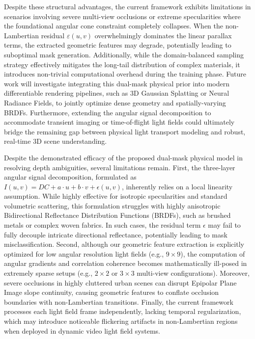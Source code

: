 Despite these structural advantages, the current framework exhibits limitations in scenarios involving severe multi-view occlusions or extreme specularities where the foundational angular cone constraint completely collapses. When the non-Lambertian residual $\varepsilon(u,v)$ overwhelmingly dominates the linear parallax terms, the extracted geometric features may degrade, potentially leading to suboptimal mask generation. Additionally, while the domain-balanced sampling strategy effectively mitigates the long-tail distribution of complex materials, it introduces non-trivial computational overhead during the training phase. Future work will investigate integrating this dual-mask physical prior into modern differentiable rendering pipelines, such as 3D Gaussian Splatting or Neural Radiance Fields, to jointly optimize dense geometry and spatially-varying BRDFs. Furthermore, extending the angular signal decomposition to accommodate transient imaging or time-of-flight light fields could ultimately bridge the remaining gap between physical light transport modeling and robust, real-time 3D scene understanding.

Despite the demonstrated efficacy of the proposed dual-mask physical model in resolving depth ambiguities, several limitations remain. First, the three-layer angular signal decomposition, formulated as $I(u,v) = DC + a\cdot u + b\cdot v + \epsilon(u,v)$, inherently relies on a local linearity assumption. While highly effective for isotropic specularities and standard volumetric scattering, this formulation struggles with highly anisotropic Bidirectional Reflectance Distribution Functions (BRDFs), such as brushed metals or complex woven fabrics. In such cases, the residual term $\epsilon$ may fail to fully decouple intricate directional reflectance, potentially leading to mask misclassification. Second, although our geometric feature extraction is explicitly optimized for low angular resolution light fields (e.g., $9 \times 9$), the computation of angular gradients and correlation coherence becomes mathematically ill-posed in extremely sparse setups (e.g., $2 \times 2$ or $3 \times 3$ multi-view configurations). Moreover, severe occlusions in highly cluttered urban scenes can disrupt Epipolar Plane Image slope continuity, causing geometric features to conflate occlusion boundaries with non-Lambertian transitions. Finally, the current framework processes each light field frame independently, lacking temporal regularization, which may introduce noticeable flickering artifacts in non-Lambertian regions when deployed in dynamic video light field systems.

